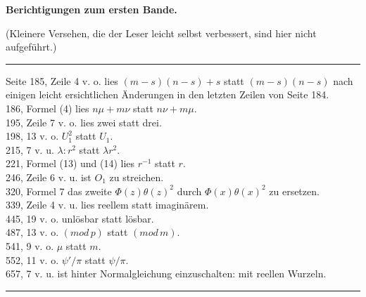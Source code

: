 
\begin{center}
\textbf{Berichtigungen zum ersten Bande.}
\end{center}

\noindent (Kleinere Versehen, die der Leser leicht selbst verbessert, sind hier nicht aufgeführt.)

\begin{center}
\rule{3cm}{0.4pt}
\end{center}

\bigskip
\noindent Seite 185, Zeile 4 v. o. lies $(m-s)(n-s)+s$ statt $(m-s)(n-s)$ nach
einigen leicht ersichtlichen Änderungen in den letzten Zeilen von
Seite 184.\\
\glqq{} 186, Formel (4) lies $n\mu + m\nu$ statt $n\nu + m\mu$.\\
\glqq{} 195, Zeile 7 v. o. lies zwei statt drei.\\
\glqq{} 198, \glqq{} 13 v. o. \glqq{} $U_1^2$ statt $U_1$.\\
\glqq{} 215, \glqq{} 7 v. u. \glqq{} $\lambda : r^2$ statt $\lambda r^2$.\\
\glqq{} 221, Formel (13) und (14) lies $r^{-1}$ statt $r$.\\
\glqq{} 246, Zeile 6 v. u. ist $O_1$ zu streichen.\\
\glqq{} 320, Formel 7 das zweite $\Phi(z)\theta(z)^2$ durch $\Phi(x)\theta(x)^2$ zu ersetzen.\\
\glqq{} 339, Zeile 4 v. u. lies reellem statt imaginärem.\\
\glqq{} 445, \glqq{} 19 v. o. \glqq{} unlösbar statt lösbar.\\
\glqq{} 487, \glqq{} 13 v. o. \glqq{} $(\mathit{mod}\,p)$ statt $(\mathit{mod}\,m)$.\\
\glqq{} 541, \glqq{} 9 v. o. \glqq{} $\mu$ statt $m$.\\
\glqq{} 552, \glqq{} 11 v. o. \glqq{} $\psi'/\pi$ statt $\psi/\pi$.\\
\glqq{} 657, \glqq{} 7 v. u. ist hinter \glqq Normalgleichung\grqq{} einzuschalten: mit
reellen Wurzeln.

\begin{center}
\rule{3cm}{0.4pt}
\end{center}


